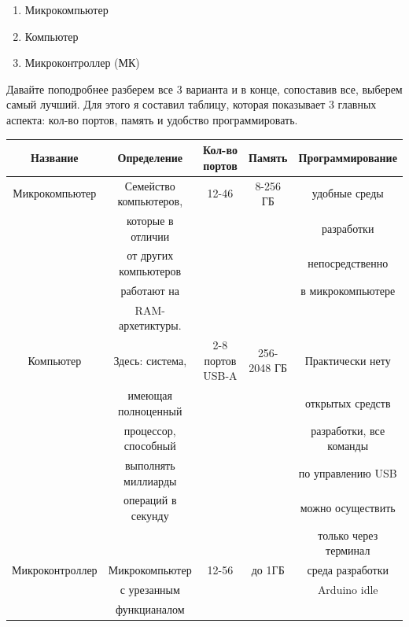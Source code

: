 \documentclass[a4paper, 12pt]{article}
\begin{document}
\begin{enumerate}
	\item   Микрокомпьютер
	\item   Компьютер
	\item   Микроконтроллер (МК)
\end{enumerate}


\newpage
Давайте поподробнее разберем все 3 варианта и в конце, сопоставив все, выберем 
самый лучший. Для этого я составил таблицу, которая показывает 3 главных 
аспекта: кол-во портов, память и удобство программировать.
\begin{center}
\begin{small}
\begin{tabular}{ |c|c|c|c|c|}
	\hline
	Название        & Определение            & Кол-во портов    & Память      & Программирование        \\ \hline

	Микрокомпьютер  & Семейство компьютеров, & 12-46            & 8-256 ГБ    & удобные среды           \\
	                & которые в отличии      &                  &             & разработки              \\
	                & от других компьютеров  &                  &             & непосредственно         \\
	                & работают на            &                  &             & в микрокомпьютере       \\
	                & RAM-архетиктуры.       &                  &             &                         \\ \hline

	Компьютер       & Здесь: система,        & 2-8 портов USB-A & 256-2048 ГБ & Практически нету        \\
	                & имеющая полноценный    &                  &             & открытых средств        \\
	                & процессор, способный   &                  &             & разработки, все команды \\
	                & выполнять миллиарды    &                  &             & по управлению USB       \\
	                & операций в секунду     &                  &             & можно осуществить       \\
	                &                        &                  &             & только через терминал   \\\hline

	Микроконтроллер & Микрокомпьютер         & 12-56            & до 1ГБ      & среда разработки        \\
	                & с урезанным            &                  &             & Arduino idle            \\
	                & функцианалом           &                  &             &                         \\
	\hline
\end{tabular}
\end{small}
\end{center}
\end{document}
